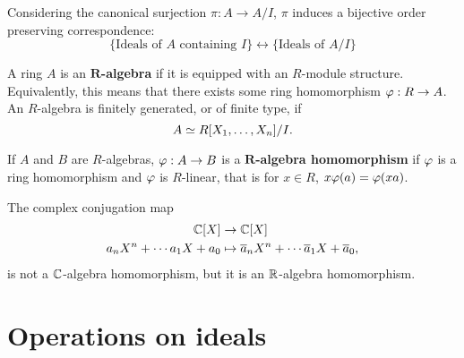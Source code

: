 \documentclass{ximera}
\begin{document}
\begin{theorem}\label{T:corr}
  Considering the canonical surjection $\pi:A \to A/I$, $\pi$ induces
  a bijective order preserving correspondence:
  \[
  \{\text{Ideals of $A$ containing $I$}\} \longleftrightarrow \{\text{Ideals of $A/I$}\} 
  \]
\end{theorem}








\begin{definition}
  A ring $A$ is an \textbf{$\boldsymbol{R}$-algebra} if it is equipped
  with an $R$-module structure. Equivalently, this means that there
  exists some ring homomorphism $\varphi:R\to A$. An $R$-algebra is
  finitely generated, or of finite type, if
  \[
  A \simeq R[X_1,\dots,X_n]/I.
  \]
\end{definition}

\begin{definition}
  If $A$ and $B$ are $R$-algebras, $\varphi:A\to B$ is a
  \textbf{$\boldsymbol{R}$-algebra homomorphism} if $\varphi$ is a ring
  homomorphism and $\varphi$ is $R$-linear, that is for $x\in R$, $x\varphi(a)
  = \varphi(xa)$.
\end{definition}


\begin{example} The complex conjugation map
\begin{align*}
\mathbb C[X] &\to \mathbb C[X]\\
a_nX^n + \cdots a_1X + a_0 &\mapsto \overline{a}_nX^n + \cdots \overline{a}_1X + \overline{a}_0, 
\end{align*}
is not a $\mathbb C$-algebra homomorphism, but it is an $\mathbb R$-algebra homomorphism.
\end{example}



\section{Operations on ideals}
\end{document}
